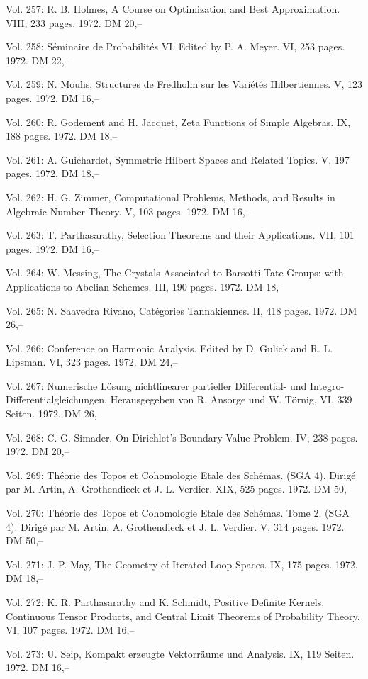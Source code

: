 Vol. 257: R. B. Holmes, A Course on Optimization and Best Approximation. VIII, 233 pages. 1972. DM 20,--

Vol. 258: Séminaire de Probabilités VI. Edited by P. A. Meyer. VI, 253 pages. 1972. DM 22,--

Vol. 259: N. Moulis, Structures de Fredholm sur les Variétés Hilbertiennes. V, 123 pages. 1972. DM 16,--

Vol. 260: R. Godement and H. Jacquet, Zeta Functions of Simple Algebras. IX, 188 pages. 1972. DM 18,--

Vol. 261: A. Guichardet, Symmetric Hilbert Spaces and Related Topics. V, 197 pages. 1972. DM 18,--

Vol. 262: H. G. Zimmer, Computational Problems, Methods, and Results in Algebraic Number Theory. V, 103 pages. 1972. DM 16,--

Vol. 263: T. Parthasarathy, Selection Theorems and their Applications. VII, 101 pages. 1972. DM 16,--

Vol. 264: W. Messing, The Crystals Associated to Barsotti-Tate Groups: with Applications to Abelian Schemes. III, 190 pages. 1972. DM 18,--

Vol. 265: N. Saavedra Rivano, Catégories Tannakiennes. II, 418 pages. 1972. DM 26,--

Vol. 266: Conference on Harmonic Analysis. Edited by D. Gulick and R. L. Lipsman. VI, 323 pages. 1972. DM 24,--

Vol. 267: Numerische Lösung nichtlinearer partieller Differential- und Integro-Differentialgleichungen. Herausgegeben von R. Ansorge und W. Törnig, VI, 339 Seiten. 1972. DM 26,--

Vol. 268: C. G. Simader, On Dirichlet's Boundary Value Problem. IV, 238 pages. 1972. DM 20,--

Vol. 269: Théorie des Topos et Cohomologie Etale des Schémas. (SGA 4). Dirigé par M. Artin, A. Grothendieck et J. L. Verdier. XIX, 525 pages. 1972. DM 50,--

Vol. 270: Théorie des Topos et Cohomologie Etale des Schémas. Tome 2. (SGA 4). Dirigé par M. Artin, A. Grothendieck et J. L. Verdier. V, 314 pages. 1972. DM 50,--

Vol. 271: J. P. May, The Geometry of Iterated Loop Spaces. IX, 175 pages. 1972. DM 18,--

Vol. 272: K. R. Parthasarathy and K. Schmidt, Positive Definite Kernels, Continuous Tensor Products, and Central Limit Theorems of Probability Theory. VI, 107 pages. 1972. DM 16,--

Vol. 273: U. Seip, Kompakt erzeugte Vektorräume und Analysis. IX, 119 Seiten. 1972. DM 16,--

